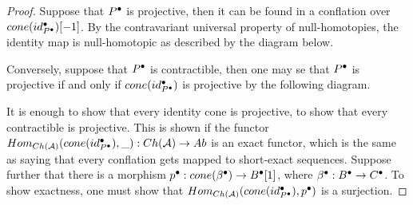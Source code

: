     \begin{proof}
        Suppose that $P^{\bullet}$ is projective, then it can be found in a conflation over $cone(id_{P^{\bullet}}^{\bullet})[-1]$. By the contravariant universal property of null-homotopies, the identity map is null-homotopic as described by the diagram below.
        \begin{center}
        \end{center}

        Conversely, suppose that $P^{\bullet}$ is contractible, then one may se that $P^{\bullet}$ is projective if and only if $cone(id_{P^{\bullet}}^{\bullet})$ is projective by the following diagram.

        \begin{center}
        \end{center}
        
        It is enough to show that every identity cone is projective, to show that every contractible is projective. This is shown if the functor \\$Hom_{Ch(\mathcal{A})}(cone(id_{P^{\bullet}}^{\bullet}),\_):Ch(\mathcal{A})\rightarrow Ab$ is an exact functor, which is the same as saying that every conflation gets mapped to short-exact sequences.
        Suppose further that there is a morphism $p^{\bullet}:cone(\beta^{\bullet})\rightarrow B^{\bullet}[1]$, where $\beta^{\bullet}:B^{\bullet}\rightarrow C^{\bullet}$. To show exactness, one must show that $Hom_{Ch(\mathcal{A})}(cone(id_{P^{\bullet}}^{\bullet}),p^{\bullet})$ is a surjection.



\end{proof}
